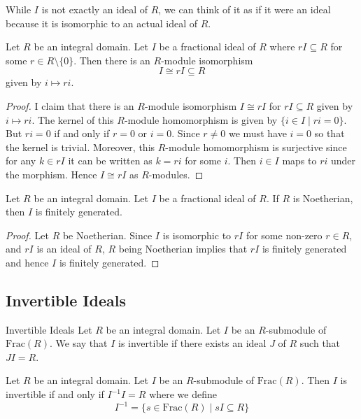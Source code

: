 \documentclass[a4paper]{article}
\begin{document}
While $I$ is not exactly an ideal of $R$, we can think of it as if it were an ideal because it is isomorphic to an actual ideal of $R$. 

\begin{lmm}{}{} Let $R$ be an integral domain. Let $I$ be a fractional ideal of $R$ where $rI\subseteq R$ for some $r\in R\setminus\{0\}$. Then there is an $R$-module isomorphism $$I\cong rI\subseteq R$$ given by $i\mapsto ri$. \tcbline
\begin{proof}
I claim that there is an $R$-module isomorphism $I\cong rI$ for $rI\subseteq R$ given by $i\mapsto ri$. The kernel of this $R$-module homomorphism is given by $\{i\in I\;|\;ri=0\}$. But $ri=0$ if and only if $r=0$ or $i=0$. Since $r\neq 0$ we must have $i=0$ so that the kernel is trivial. Moreover, this $R$-module homomorphism is surjective since for any $k\in rI$ it can be written as $k=ri$ for some $i$. Then $i\in I$ maps to $ri$ under the morphism. Hence $I\cong rI$ as $R$-modules. 
\end{proof}
\end{lmm}

\begin{lmm}{}{} Let $R$ be an integral domain. Let $I$ be a fractional ideal of $R$. If $R$ is Noetherian, then $I$ is finitely generated. \tcbline
\begin{proof}
Let $R$ be Noetherian. Since $I$ is isomorphic to $rI$ for some non-zero $r\in R$, and $rI$ is an ideal of $R$, $R$ being Noetherian implies that $rI$ is finitely generated and hence $I$ is finitely generated. 
\end{proof}
\end{lmm}

\subsection{Invertible Ideals}
\begin{defn}{Invertible Ideals}{} Let $R$ be an integral domain. Let $I$ be an $R$-submodule of $\text{Frac}(R)$. We say that $I$ is invertible if there exists an ideal $J$ of $R$ such that $JI=R$. 
\end{defn}

\begin{lmm}{}{} Let $R$ be an integral domain. Let $I$ be an $R$-submodule of $\text{Frac}(R)$. Then $I$ is invertible if and only if $I^{-1}I=R$ where we define $$I^{-1}=\{s\in\text{Frac}(R)\;|\;sI\subseteq R\}$$
\end{lmm}
\end{document}
